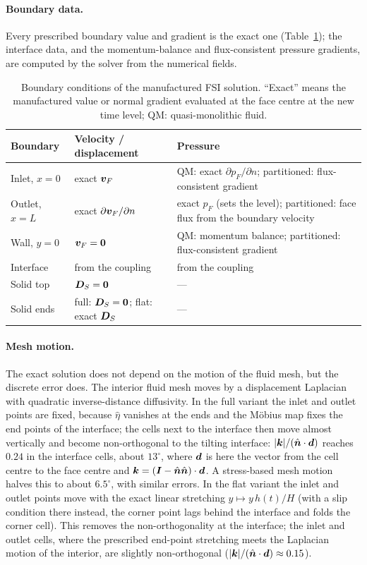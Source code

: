 \paragraph{Boundary data.}
Every prescribed boundary value and gradient is the exact one (Table~\ref{tab:mms_bc}); the interface data, and the momentum-balance and flux-consistent pressure gradients, are computed by the solver from the numerical fields.

\begin{table}[htbp]
	\centering
	\small
	\caption{Boundary conditions of the manufactured FSI solution. ``Exact'' means the manufactured value or normal gradient evaluated at the face centre at the new time level; QM: quasi-monolithic fluid.}
	\label{tab:mms_bc}
	\begin{tabular}{lp{3.2cm}p{6.2cm}}
		\toprule
		Boundary & Velocity / displacement & Pressure \\
		\midrule
		Inlet, $x = 0$ & exact $\boldsymbol{v}_F$ & QM: exact $\partial p_F/\partial n$; partitioned: flux-consistent gradient \\
		Outlet, $x = L$ & exact $\partial\boldsymbol{v}_F/\partial n$ & exact $p_F$ (sets the level); partitioned: face flux from the boundary velocity \\
		Wall, $y = 0$ & $\boldsymbol{v}_F = \boldsymbol{0}$ & QM: momentum balance; partitioned: flux-consistent gradient \\
		Interface & from the coupling & from the coupling \\
		Solid top & $\boldsymbol{D}_S = \boldsymbol{0}$ & --- \\
		Solid ends & full: $\boldsymbol{D}_S = \boldsymbol{0}$; flat: exact $\boldsymbol{D}_S$ & --- \\
		\bottomrule
	\end{tabular}
\end{table}

\paragraph{Mesh motion.}
The exact solution does not depend on the motion of the fluid mesh, but the discrete error does.
The interior fluid mesh moves by a displacement Laplacian with quadratic inverse-distance diffusivity.
In the full variant the inlet and outlet points are fixed, because $\hat\eta$ vanishes at the ends and the M\"obius map fixes the end points of the interface; the cells next to the interface then move almost vertically and become non-orthogonal to the tilting interface: $|\boldsymbol{k}|/(\hat{\boldsymbol{n}}\cdot\boldsymbol{d})$ reaches $0.24$ in the interface cells, about $13^\circ$, where $\boldsymbol{d}$ is here the vector from the cell centre to the face centre and $\boldsymbol{k} = (\boldsymbol{I} - \hat{\boldsymbol{n}}\hat{\boldsymbol{n}})\cdot\boldsymbol{d}$.
A stress-based mesh motion halves this to about $6.5^\circ$, with similar errors.
In the flat variant the inlet and outlet points move with the exact linear stretching $y \mapsto y\,h(t)/H$ (with a slip condition there instead, the corner point lags behind the interface and folds the corner cell).
This removes the non-orthogonality at the interface; the inlet and outlet cells, where the prescribed end-point stretching meets the Laplacian motion of the interior, are slightly non-orthogonal ($|\boldsymbol{k}|/(\hat{\boldsymbol{n}}\cdot\boldsymbol{d}) \approx 0.15$).

